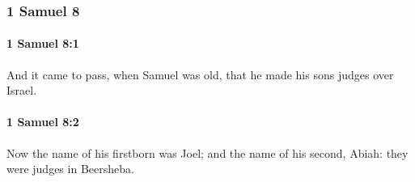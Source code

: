 	\subsubsection{1 Samuel 8} %
		\label{1SAMUEL-8}

		\paragraph{1 Samuel 8:1} %
			\label{1SAMUEL-8-1}

			And it came to pass, when Samuel was old, that he made his sons judges over Israel.


		\paragraph{1 Samuel 8:2} %
			\label{1SAMUEL-8-2}

			Now the name of his firstborn was Joel; and the name of his second, Abiah: they were judges in Beersheba.

